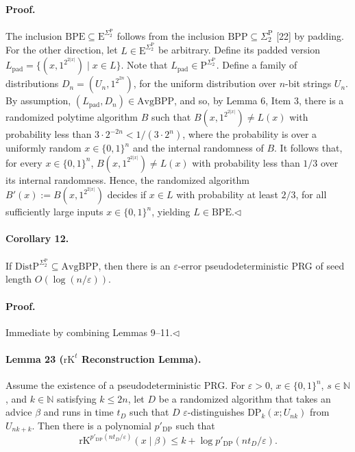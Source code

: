 \documentclass[10pt,a4paper]{article}
\begin{document}
\paragraph{Proof.} The inclusion $\mathrm{BPE}\subseteq\mathrm E^{\Sigma_2^{\mathrm P}}$ follows from the inclusion $\mathrm{BPP}\subseteq\Sigma_2^{\mathrm P}$ [22] by padding. For the other direction, let $L\in\mathrm E^{\Sigma_2^{\mathrm P}}$ be arbitrary. Define its padded version $L_{\mathrm{pad}}=\{(x,1^{2^{2|x|}})\mid x\in L\}$. Note that $L_{\mathrm{pad}}\in\mathrm P^{\Sigma_2^{\mathrm P}}$. Define a family of distributions $D_n=(U_n,1^{2^{2n}})$, for the uniform distribution over $n$-bit strings $U_n$. By assumption, $(L_{\mathrm{pad}},D_n)\in\mathrm{AvgBPP}$, and so, by Lemma 6, Item 3, there is a randomized polytime algorithm $B$ such that $B(x,1^{2^{2|x|}})\neq L(x)$ with probability less than $3\cdot2^{-2n}<1/(3\cdot2^n)$, where the probability is over a uniformly random $x\in\{0,1\}^n$ and the internal randomness of $B$. It follows that, for every $x\in\{0,1\}^n$, $B(x,1^{2^{2|x|}})\neq L(x)$ with probability less than $1/3$ over its internal randomness. Hence, the randomized algorithm $B'(x):=B(x,1^{2^{2|x|}})$ decides if $x\in L$ with probability at least $2/3$, for all sufficiently large inputs $x\in\{0,1\}^n$, yielding $L\in\mathrm{BPE}$.\hfill$\triangleleft$
\paragraph{Corollary 12.} If $\mathrm{DistP}^{\Sigma_2^{\mathrm P}}\subseteq\mathrm{AvgBPP}$, then there is an $\varepsilon$-error pseudodeterministic PRG of seed length $O(\log(n/\varepsilon))$.
\paragraph{Proof.} Immediate by combining Lemmas 9–11.\hfill$\triangleleft$
\paragraph{Lemma 23 ($\mathrm{rK}^t$ Reconstruction Lemma).} Assume the existence of a pseudodeterministic PRG. For $\varepsilon>0$, $x\in\{0,1\}^n$, $s\in\mathbb N$, and $k\in\mathbb N$ satisfying $k\leq2n$, let $D$ be a randomized algorithm that takes an advice $\beta$ and runs in time $t_D$ such that $D$ $\varepsilon$-distinguishes $\mathrm{DP}_k(x;U_{nk})$ from $U_{nk+k}$. Then there is a polynomial $p'_{\mathrm{DP}}$ such that
\[\mathrm{rK}^{p'_{\mathrm{DP}}(nt_D/\varepsilon)}(x\mid\beta)\leq k+\log p'_{\mathrm{DP}}(nt_D/\varepsilon).\]
\end{document}
